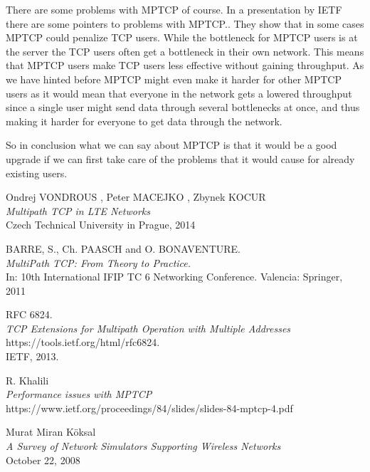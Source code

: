\documentclass[11pt,twocolumn]{article}
\begin{document}
There are some problems with MPTCP of course. In a presentation by IETF there are some pointers to problems with MPTCP.\cite{IETF-Probs}. They show that in some cases MPTCP could penalize TCP users. While the bottleneck for MPTCP users is at the server the TCP users often get a bottleneck in their own network. This means that MPTCP users make TCP users less effective without gaining throughput. As we have hinted before MPTCP might even make it harder for other MPTCP users as it would mean that everyone in the network gets a lowered throughput since a single user might send data through several bottlenecks at once, and thus making it harder for everyone to get data through the network.

So in conclusion what we can say about MPTCP is that it would be a good upgrade if we can first take care of the problems that it would cause for already existing users.




\newpage

\begin{thebibliography}{9}

Ondrej VONDROUS , Peter MACEJKO , Zbynek KOCUR \\
\emph{Multipath TCP in LTE Networks}\\
Czech Technical University in Prague, 2014

BARRE, S., Ch. PAASCH and O. BONAVENTURE.\\
\emph{MultiPath TCP: From Theory to Practice.}\\
In: 10th International IFIP TC 6 Networking
Conference. Valencia: Springer, 2011

RFC 6824.  \\
\emph{TCP Extensions for Multipath Operation with Multiple Addresses} \\ 
https://tools.ietf.org/html/rfc6824.\\ IETF, 2013.

R. Khalili\\
\emph{Performance issues with MPTCP}\\
https://www.ietf.org/proceedings/84/slides/slides-84-mptcp-4.pdf



Murat Miran Köksal\\
\emph{A Survey of Network Simulators Supporting Wireless Networks} \\
October 22, 2008



\end{thebibliography}
\end{document}
